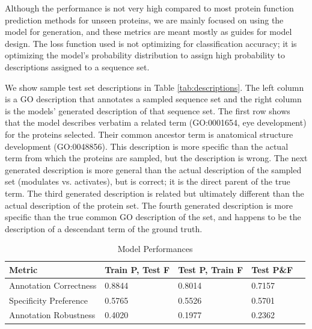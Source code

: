 \documentclass{article}
\begin{document}
        Although the performance is not very high compared to most protein function prediction methods for unseen proteins, we are mainly focused on using the model for generation, and these metrics are meant mostly as guides for model design. The loss function used is not optimizing for classification accuracy; it is optimizing the model's probability distribution to assign high probability to descriptions assigned to a sequence set.

        We show sample test set descriptions in Table \ref{tab:descriptions}. The left column is a GO description that annotates a sampled sequence set and the right column is the models' generated description of that sequence set. The first row shows that the model describes verbatim a related term (GO:0001654, eye development) for the proteins selected. Their common ancestor term is anatomical structure development (GO:0048856). This description is more specific than the actual term from which the proteins are sampled, but the description is wrong. The next generated description is more general than the actual description of the sampled set (modulates vs. activates), but is correct; it is the direct parent of the true term. The third generated description is related but ultimately different than the actual description of the protein set. The fourth generated description is more specific than the true common GO description of the set, and happens to be the description of a descendant term of the ground truth.
\begin{table}
	\caption{Model Performances}
	\centering
	\begin{tabular}{l|llll}
		\toprule
        Metric & Train P, Test F & Test P, Train F & Test P\&F \\
		\midrule
        Annotation Correctness & 0.8844 & 0.8014 & 0.7157 \\
        Specificity Preference & 0.5765 & 0.5526 & 0.5701 \\
		Annotation Robustness & 0.4020 & 0.1977 & 0.2362 \\
		\bottomrule
	\end{tabular}
	\label{tab:performances}
\end{table}
\end{document}
